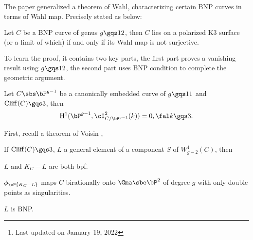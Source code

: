\documentclass[a4paper, twoside]{article}
\title{\tbf{ABS2017}}
\author{\tbf{Notes} by Cong Wen, 12/2022}
\date{}
\begin{document}
\maketitle
\thispagestyle{empty}
\begin{abstract}
	This is my self-use notes\footnote{Last updated on January 19, 2022} on \cite{ABS2017}. Please reach out if you find anything incorrect.

\end{abstract}
\tableofcontents


The paper generalized a theorem of Wahl\cite{Wahl1997}, characterizing certain BNP curves in terms of Wahl map. Precisely stated as below:

\begin{thm}[Theorem~1.1]
	Let $C$ be a BNP curve of genus $g\gqs12$, then $C$ lies on a polarized K3 surface (or a limit of which) if and only if its Wahl map is not surjective.
\end{thm}

To learn the proof, it contains two key parts, the first part proves a vanishing result using $g\gqs12$, the second part uses BNP condition to complete the geometric argument.


\begin{thm}[Theorem~1.3]
	Let $C\sbs\bP^{g-1}$ be a canonically embedded curve of $g\gqs11$ and $\mathrm{Cliff}(C)\gqs3$, then
	\[
		\mathrm{H}_{}^{1}(\bP^{g-1},\cI_{C/\bP^{g-1}}^{2}(k))=0,\fal k\gqs3.
	\]
\end{thm}


First, recall a theorem of Voisin \cite{Voisin1988},
\begin{thm}[Theorem~2.3]
	If $\mathrm{Cliff}(C)\gqs3$, $L$ a general element of a component $S$ of $W_{g-2}^{1}(C)$, then
	\begin{enr}
		\item $L$ and $K_{C}-L$ are both bpf.
		\item $\phi_{\sP{K_{C}-L}}$ maps $C$ birationally onto $\Gma\sbe\bP^{2}$ of degree $g$ with only double points as singularities.
		\item $L$ is BNP.
	\end{enr}
\end{thm}
\end{document}
